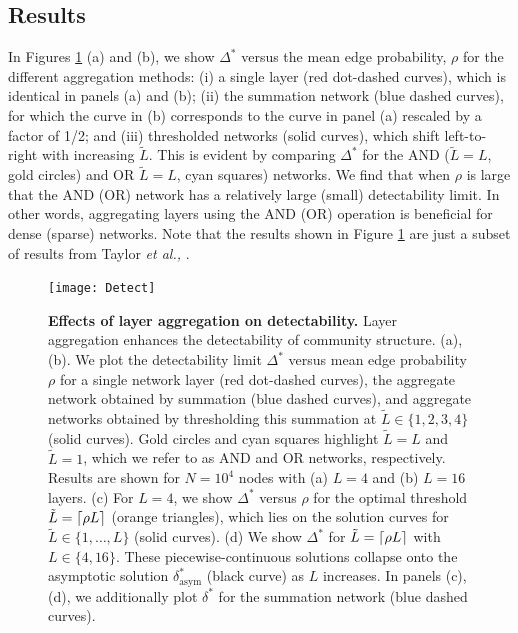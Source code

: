 \subsection{Results}

In Figures \ref{Detect} (a) and (b), we show $\Delta^{*}$ versus the mean edge probability, $\rho$ for the different aggregation methods: (i) a single layer (red dot-dashed curves), which is identical in panels (a) and (b); (ii) the summation network (blue dashed curves), for which the curve in (b) corresponds to the curve in panel (a) rescaled by a factor of 1/2; and (iii) thresholded networks (solid curves), which shift left-to-right with increasing $\tilde{L}$. This is evident by comparing $\Delta^{*}$ for the AND ($\tilde{L}=L$, gold circles) and OR $\tilde{L}=L$, cyan squares) networks. We find that when $\rho$ is large that the AND (OR) network has a relatively large (small) detectability limit. In other words, aggregating layers using the AND (OR) operation is beneficial for dense (sparse) networks. Note that the results shown in Figure \ref{Detect} are just a subset of results from Taylor \emph{et al.,} \cite{taylor2015enhanced}. 

\begin{figure}
\begin{center}
\texttt{[image: Detect]}
\caption{{\bf Effects of layer aggregation on detectability.} Layer aggregation enhances the detectability of community structure. (a),(b). We plot the detectability limit $\Delta^{*}$ versus mean edge probability $\rho$ for a single network layer (red dot-dashed curves), the aggregate network obtained by summation (blue dashed curves), and aggregate networks obtained by thresholding this summation at $\tilde{L} \in \{1,2,3,4\}$ (solid curves). Gold circles and cyan squares highlight $\tilde{L}=L$ and $\tilde{L}=1$, which we refer to as AND and OR networks, respectively. Results are shown for $N=10^{4}$ nodes with (a) $L=4$ and (b) $L=16$ layers. (c) For $L=4$, we show $\Delta^{*}$ versus $\rho$ for the optimal threshold $\tilde{L}=\ceil*{\rho L}$ (orange triangles), which lies on the solution curves for $\tilde{L} \in \{1,\dots,L\}$ (solid curves). (d) We show $\Delta^{*}$ for $\tilde{L}=\ceil*{\rho L}$ with $L \in \{4,16\}$. These piecewise-continuous solutions collapse onto the asymptotic solution $\delta_{\text{asym}}^{*}$ (black curve) as $L$ increases. In panels (c), (d), we additionally plot $\delta^{*}$ for the summation network (blue dashed curves). }
\label{Detect}
\end{center}
\end{figure}

